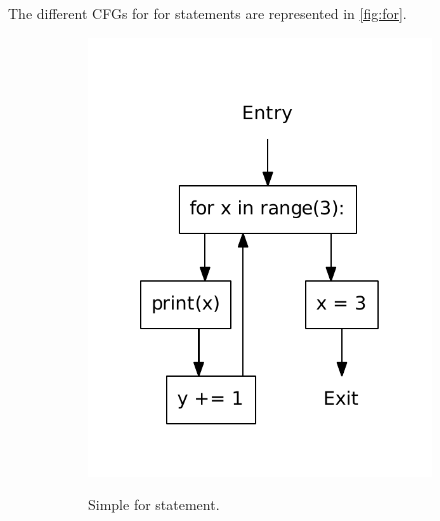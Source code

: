 The different CFGs for for statements are represented in \cref{fig:for}.
\begin{figure}
  \centering
  \begin{subfigure}[b]{.4\textwidth}
    \includegraphics[scale=.5]{./figures/for.pdf}
    \label{fig:for:for_no_orelse}    
    \caption{Simple for statement.}
  \end{subfigure}
  ~
  \begin{subfigure}[b]{.4\textwidth}

\end{subfigure}
\end{figure}
